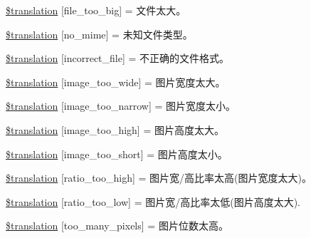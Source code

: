 \begin{DoxyCompactItemize}
\item 
\hyperlink{class_8upload_8zh___c_n_8php_a476278eb4a0c3df56af068e2d511a741}{\$translation} \mbox{[}\textquotesingle{}file\+\_\+too\+\_\+big\textquotesingle{}\mbox{]} = \textquotesingle{}文件太大。\textquotesingle{}
\item 
\hyperlink{class_8upload_8zh___c_n_8php_a191a55df8e3bb7f3c51b70f3c1932e02}{\$translation} \mbox{[}\textquotesingle{}no\+\_\+mime\textquotesingle{}\mbox{]} = \textquotesingle{}未知文件类型。\textquotesingle{}
\item 
\hyperlink{class_8upload_8zh___c_n_8php_a4d32343e2699edd6fd435f9c832cb9c7}{\$translation} \mbox{[}\textquotesingle{}incorrect\+\_\+file\textquotesingle{}\mbox{]} = \textquotesingle{}不正确的文件格式。\textquotesingle{}
\item 
\hyperlink{class_8upload_8zh___c_n_8php_a0dd3e4930ca1f59ae280f4b1006525cd}{\$translation} \mbox{[}\textquotesingle{}image\+\_\+too\+\_\+wide\textquotesingle{}\mbox{]} = \textquotesingle{}图片宽度太大。\textquotesingle{}
\item 
\hyperlink{class_8upload_8zh___c_n_8php_a5c9a4cd67fd21c32e0a3b434591a6037}{\$translation} \mbox{[}\textquotesingle{}image\+\_\+too\+\_\+narrow\textquotesingle{}\mbox{]} = \textquotesingle{}图片宽度太小。\textquotesingle{}
\item 
\hyperlink{class_8upload_8zh___c_n_8php_aa27bde361343f3b63c7cd441860024f8}{\$translation} \mbox{[}\textquotesingle{}image\+\_\+too\+\_\+high\textquotesingle{}\mbox{]} = \textquotesingle{}图片高度太大。\textquotesingle{}
\item 
\hyperlink{class_8upload_8zh___c_n_8php_a86fcd4e1157b00032df451188d735527}{\$translation} \mbox{[}\textquotesingle{}image\+\_\+too\+\_\+short\textquotesingle{}\mbox{]} = \textquotesingle{}图片高度太小。\textquotesingle{}
\item 
\hyperlink{class_8upload_8zh___c_n_8php_a23396f6ce7f31e5e5f1b57580621d982}{\$translation} \mbox{[}\textquotesingle{}ratio\+\_\+too\+\_\+high\textquotesingle{}\mbox{]} = \textquotesingle{}图片宽/高比率太高(图片宽度太大)。\textquotesingle{}
\item 
\hyperlink{class_8upload_8zh___c_n_8php_ac533b9a479f056b0b8623e4268f068c2}{\$translation} \mbox{[}\textquotesingle{}ratio\+\_\+too\+\_\+low\textquotesingle{}\mbox{]} = \textquotesingle{}图片宽/高比率太低(图片高度太大).\textquotesingle{}
\item 
\hyperlink{class_8upload_8zh___c_n_8php_aa4051ef64e94a3f8295c63cf85544016}{\$translation} \mbox{[}\textquotesingle{}too\+\_\+many\+\_\+pixels\textquotesingle{}\mbox{]} = \textquotesingle{}图片位数太高。\textquotesingle{}

\end{DoxyCompactItemize}
